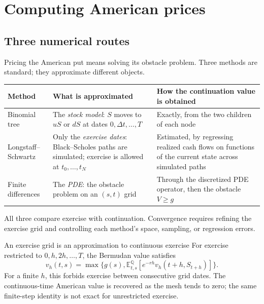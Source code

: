 \documentclass[10pt]{article}
\newcommand{\E}{\mathbb E}
\newcommand{\Q}{\mathbb Q}
\newcommand{\1}{\mathbf 1}
\theoremstyle{definition}
\begin{document}
\section{Computing American prices}

\subsection{Three numerical routes}

Pricing the American put means solving its obstacle problem. Three methods
are standard; they approximate different objects.

\begin{center}
\renewcommand{\arraystretch}{1.25}
\begin{tabular}{>{\raggedright\arraybackslash}p{}
                >{\raggedright\arraybackslash}p{}
                >{\raggedright\arraybackslash}p{}}
\toprule
Method & What is approximated & How the continuation value is obtained\\
\midrule
Binomial tree
  & The \emph{stock model}: \(S\) moves to \(uS\) or \(dS\) at dates
    \(0,\Delta t,\ldots,T\)
  & Exactly, from the two children of each node\\
Longstaff--Schwartz
  & Only the \emph{exercise dates}: Black--Scholes paths are simulated;
    exercise is allowed at \(t_0,\ldots,t_N\)
  & Estimated, by regressing realized cash flows on functions of the
    current state across simulated paths\\
Finite differences
  & The \emph{PDE}: the obstacle problem on an \((s,t)\) grid
  & Through the discretized PDE operator, then the obstacle \(V\geq g\)\\
\bottomrule
\end{tabular}
\end{center}
All three compare exercise with continuation. Convergence requires refining
the exercise grid and controlling each method's space, sampling, or regression errors.

\begin{warningbox}{An exercise grid is an approximation to continuous exercise}
For exercise restricted to \(0,h,2h,\ldots,T\), the Bermudan value satisfies
\[
v_h(t,s)=\max\{g(s),\E^\Q_{t,s}[e^{-rh}v_h(t+h,S_{t+h})]\}.
\]
For a finite \(h\), this forbids exercise between consecutive grid dates.
The continuous-time American value is recovered as the mesh tends to zero;
the same finite-step identity is not exact for unrestricted exercise.
\end{warningbox}
\end{document}
